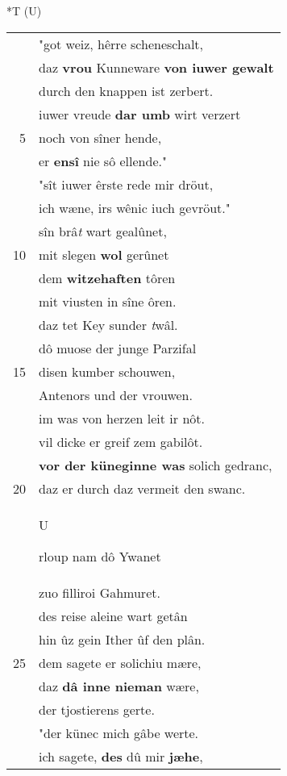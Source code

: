 \documentclass[8pt,a4paper,notitlepage]{article}
\begin{document}
\begin{table}[ht]
\begin{minipage}[t]{0.5\linewidth}
\small
\begin{center}*T (U)
\end{center}
\begin{tabular}{rl}
 & "got weiz, hêrre scheneschalt,\\ 
 & daz \textbf{vrou} Kunneware \textbf{von iuwer gewalt}\\ 
 & durch den knappen ist zerbert.\\ 
 & iuwer vreude \textbf{dar umb} wirt verzert\\ 
5 & noch von sîner hende,\\ 
 & er \textbf{en}\textbf{sî} nie sô ellende."\\ 
 & "sît iuwer êrste rede mir dröut,\\ 
 & ich wæne, irs wênic iuch gevröut."\\ 
 & sîn brâ\textit{t} wart gealûnet,\\ 
10 & mit slegen \textbf{wol} gerûnet\\ 
 & dem \textbf{witzehaften} tôren\\ 
 & mit viusten in sîne ôren.\\ 
 & daz tet Key sunder \textit{t}wâl.\\ 
 & dô muose der junge Parzifal\\ 
15 & disen kumber schouwen,\\ 
 & Antenors und der vrouwen.\\ 
 & im was von herzen leit ir nôt.\\ 
 & vil dicke er greif zem gabilôt.\\ 
 & \textbf{vor der küneginne was} solich gedranc,\\ 
20 & daz er durch daz vermeit den swanc.\\ 
 & \begin{large}U\end{large}rloup nam dô Ywanet\\ 
 & zuo filliroi Gahmuret.\\ 
 & des reise aleine wart getân\\ 
 & hin ûz gein Ither ûf den plân.\\ 
25 & dem sagete er solichiu mære,\\ 
 & daz \textbf{dâ inne nieman} wære,\\ 
 & der tjostierens gerte.\\ 
 & "der künec mich gâbe werte.\\ 
 & ich sagete, \textbf{des} dû mir \textbf{jæhe},\\ 

\end{tabular}
\end{minipage}
\end{table}
\end{document}
